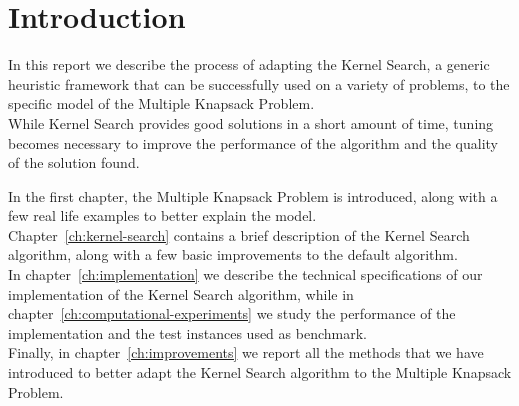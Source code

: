 \chapter{Introduction}

In this report we describe the process of adapting the Kernel Search,
a generic heuristic framework that can be successfully used on a variety of
problems, to the specific model of the Multiple Knapsack Problem.\\
While Kernel Search provides good solutions in a short amount of time,
tuning becomes necessary to improve the performance of the algorithm
and the quality of the solution found.

In the first chapter, the Multiple Knapsack Problem is introduced,
along with a few real life examples to better explain the model.\\
Chapter~\ref{ch:kernel-search} contains a brief description of the Kernel Search algorithm,
along with a few basic improvements to the default algorithm.\\
In chapter~\ref{ch:implementation} we describe the technical
specifications of our implementation of the Kernel Search algorithm,
while in chapter~\ref{ch:computational-experiments} we study
the performance of the implementation and the test instances used as benchmark.\\
Finally, in chapter~\ref{ch:improvements} we report all
the methods that we have introduced to better adapt the Kernel Search
algorithm to the Multiple Knapsack Problem.
